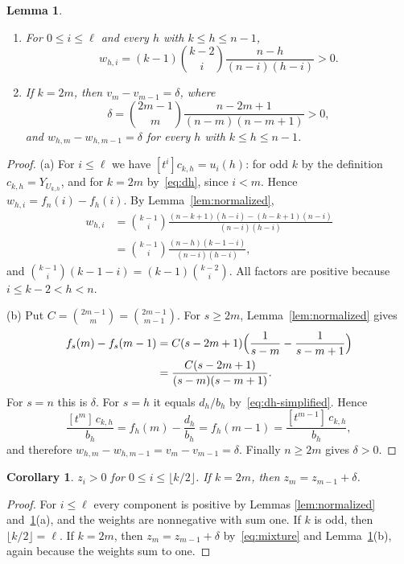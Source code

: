 \documentclass[11pt]{amsart}
\newtheorem{lemma}[theorem]{Lemma}
\newtheorem{corollary}[theorem]{Corollary}
\theoremstyle{definition}
\theoremstyle{remark}
\numberwithin{equation}{section}
\begin{document}
\begin{lemma}\label{lem:components}
\begin{enumerate}
\item[(a)] For $0\le i\le\ell$ and every $h$ with $k\le h\le n-1$,
\begin{equation}\label{eq:w}
w_{h,i}=(k-1)\binom{k-2}{i}\frac{n-h}{(n-i)(h-i)}>0 .
\end{equation}
\item[(b)] If $k=2m$, then $v_m-v_{m-1}=\delta$, where
\begin{equation}\label{eq:delta}
\delta=\binom{2m-1}{m}\frac{n-2m+1}{(n-m)(n-m+1)}>0 ,
\end{equation}
and $w_{h,m}-w_{h,m-1}=\delta$ for every $h$ with $k\le h\le n-1$.
\end{enumerate}
\end{lemma}

\begin{proof}
(a) For $i\le\ell$ we have $[t^i]c_{k,h}=u_i(h)$: for odd $k$ by the definition $c_{k,h}=Y_{U_{k,h}}$, and for $k=2m$ by~\eqref{eq:dh}, since $i<m$. Hence $w_{h,i}=f_n(i)-f_h(i)$. By Lemma~\ref{lem:normalized},
\begin{align*}
w_{h,i}&=\binom{k-1}{i}\frac{(n-k+1)(h-i)-(h-k+1)(n-i)}{(n-i)(h-i)}\\
&=\binom{k-1}{i}\frac{(n-h)(k-1-i)}{(n-i)(h-i)},
\end{align*}
and $\binom{k-1}{i}(k-1-i)=(k-1)\binom{k-2}{i}$. All factors are positive because $i\le k-2<h<n$.

(b) Put $C=\binom{2m-1}{m}=\binom{2m-1}{m-1}$. For $s\ge 2m$, Lemma~\ref{lem:normalized} gives
\begin{align*}
f_s(m)-f_s(m-1)&=C(s-2m+1)\Bigl(\frac1{s-m}-\frac1{s-m+1}\Bigr)\\
&=\frac{C(s-2m+1)}{(s-m)(s-m+1)}.
\end{align*}
For $s=n$ this is $\delta$. For $s=h$ it equals $d_h/b_h$ by~\eqref{eq:dh-simplified}. Hence
\[
\frac{[t^m]\,c_{k,h}}{b_h}=f_h(m)-\frac{d_h}{b_h}=f_h(m-1)=\frac{[t^{m-1}]\,c_{k,h}}{b_h},
\]
and therefore $w_{h,m}-w_{h,m-1}=v_m-v_{m-1}=\delta$. Finally $n\ge 2m$ gives $\delta>0$.
\end{proof}

\begin{corollary}\label{cor:positive}
$z_i>0$ for $0\le i\le\lfloor k/2\rfloor$. If $k=2m$, then $z_m=z_{m-1}+\delta$.
\end{corollary}

\begin{proof}
For $i\le\ell$ every component is positive by Lemmas \ref{lem:normalized} and~\ref{lem:components}(a), and the weights are nonnegative with sum one. If $k$ is odd, then $\lfloor k/2\rfloor=\ell$. If $k=2m$, then $z_m=z_{m-1}+\delta$ by~\eqref{eq:mixture} and Lemma~\ref{lem:components}(b), again because the weights sum to one.
\end{proof}
\end{document}

